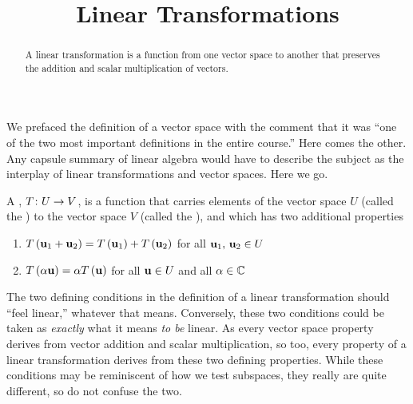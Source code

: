 \documentclass{ximera}
\title{Linear Transformations}
\begin{document}
\begin{abstract}
  A linear transformation is a function from one vector space to
  another that preserves the addition and scalar multiplication of
  vectors.
\end{abstract}
\maketitle

We prefaced the definition of a vector space with the comment that it was ``one of the two most important definitions in the entire course.''  Here comes the other.  Any capsule summary of linear algebra would have to describe the subject as the interplay of linear transformations and vector spaces.  Here we go.

\begin{definition}
A , $T\colon U\rightarrow V$, is a function that carries elements of the vector space $U$ (called the ) to the vector space $V$ (called the ), and which has two additional properties
\begin{enumerate}\item $T\left(\mathbf{u}_1+\mathbf{u}_2\right)=T\left(\mathbf{u}_1\right)+T\left(\mathbf{u}_2\right)$ for all $\mathbf{u}_1,\,\mathbf{u}_2\in U$
\item $T\left(\alpha\mathbf{u}\right)=\alpha T\left(\mathbf{u}\right)$ for all $\mathbf{u}\in U$ and all $\alpha\in\mathbb{C}$
\end{enumerate}
\end{definition}

The two defining conditions in the definition of a linear
transformation should ``feel linear,'' whatever that means.
Conversely, these two conditions could be taken as \textit{exactly}
what it means \textit{to be} linear.  As every vector space property
derives from vector addition and scalar multiplication, so too, every
property of a linear transformation derives from these two defining
properties.  While these conditions may be reminiscent of how we test
subspaces, they really are quite different, so do not confuse the two.
\end{document}
